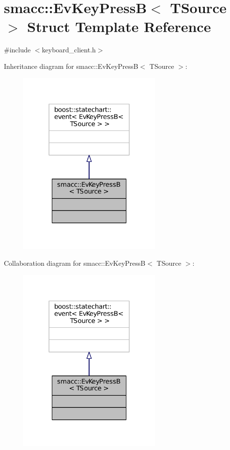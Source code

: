 \hypertarget{structsmacc_1_1EvKeyPressB}{}\section{smacc\+:\+:Ev\+Key\+PressB$<$ T\+Source $>$ Struct Template Reference}
\label{structsmacc_1_1EvKeyPressB}


{\ttfamily \#include $<$keyboard\+\_\+client.\+h$>$}



Inheritance diagram for smacc\+:\+:Ev\+Key\+PressB$<$ T\+Source $>$\+:
\nopagebreak
\begin{figure}[H]
\begin{center}
\leavevmode
\includegraphics[width=204pt]{structsmacc_1_1EvKeyPressB__inherit__graph}
\end{center}
\end{figure}


Collaboration diagram for smacc\+:\+:Ev\+Key\+PressB$<$ T\+Source $>$\+:
\nopagebreak
\begin{figure}[H]
\begin{center}
\leavevmode
\includegraphics[width=204pt]{structsmacc_1_1EvKeyPressB__coll__graph}
\end{center}
\end{figure}



